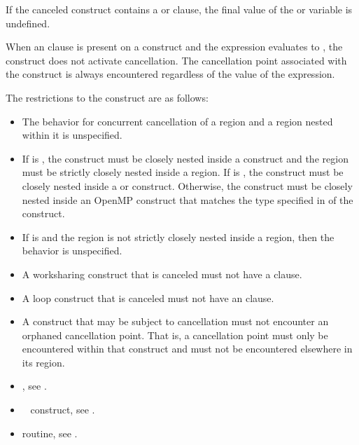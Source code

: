 If the canceled construct contains a  or  clause, the final 
value of the  or  variable is undefined.

When an  clause is present on a  construct and the  expression evaluates 
to , the  construct does not activate cancellation. The cancellation point 
associated with the  construct is always encountered regardless of the value of 
the  expression.

\restrictions
The restrictions to the  construct are as follows:

\begin{itemize}
\item The behavior for concurrent cancellation of a region and a region nested within it is 
unspecified.

\item If  is , the 
construct must be closely nested inside a  construct and the
 region must be strictly closely nested inside a  region. If
 is , the  construct
must be closely nested inside a  or  construct.
Otherwise, the  construct must be closely
nested inside an OpenMP construct that matches the type specified in
 of the  construct.

\item If  is  and the  region is not strictly closely nested 
inside a  region, then the behavior is unspecified.

\item A worksharing construct that is canceled must not have a  clause.

\item A loop construct that is canceled must not have an  clause.

\item A construct that may be subject to cancellation must not encounter an orphaned 
cancellation point. That is, a cancellation point must only be encountered within that 
construct and must not be encountered elsewhere in its region.
\end{itemize}

\crossreferences
\begin{itemize}
\item {}, see 
.

\item {}~ construct, see 
.

\item {} routine, see 
.
\end{itemize}









